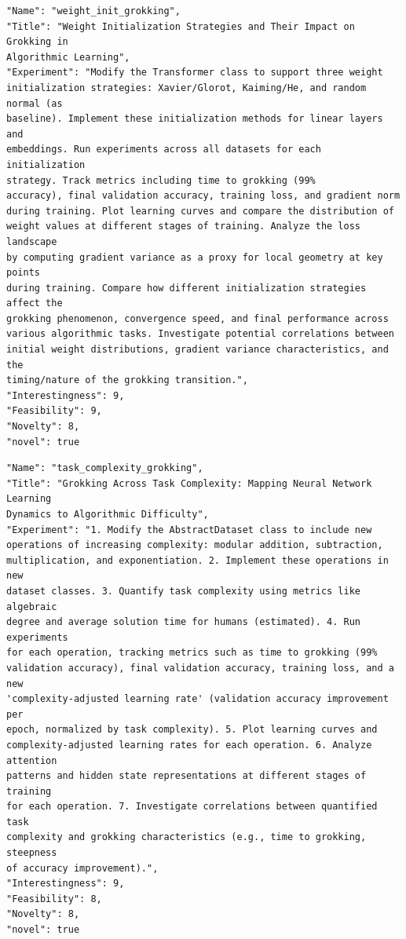 \documentclass[11pt, a4paper]{include/gdm_format}
\begin{document}
\begin{tcolorbox}[breakable,colback=blue!5!white, colframe=blue!75!black, title=Idea 9/50 - \texttt{weight\_init\_grokking}]
\small
\begin{verbatim}
"Name": "weight_init_grokking",
"Title": "Weight Initialization Strategies and Their Impact on Grokking in
Algorithmic Learning",
"Experiment": "Modify the Transformer class to support three weight
initialization strategies: Xavier/Glorot, Kaiming/He, and random normal (as
baseline). Implement these initialization methods for linear layers and
embeddings. Run experiments across all datasets for each initialization
strategy. Track metrics including time to grokking (99%
accuracy), final validation accuracy, training loss, and gradient norm
during training. Plot learning curves and compare the distribution of
weight values at different stages of training. Analyze the loss landscape
by computing gradient variance as a proxy for local geometry at key points
during training. Compare how different initialization strategies affect the
grokking phenomenon, convergence speed, and final performance across
various algorithmic tasks. Investigate potential correlations between
initial weight distributions, gradient variance characteristics, and the
timing/nature of the grokking transition.",
"Interestingness": 9,
"Feasibility": 9,
"Novelty": 8,
"novel": true
\end{verbatim}
\end{tcolorbox}

\begin{tcolorbox}[breakable,colback=blue!5!white, colframe=blue!75!black, title=Idea 10/50 - \texttt{task\_complexity\_grokking}]
\small
\begin{verbatim}
"Name": "task_complexity_grokking",
"Title": "Grokking Across Task Complexity: Mapping Neural Network Learning
Dynamics to Algorithmic Difficulty",
"Experiment": "1. Modify the AbstractDataset class to include new
operations of increasing complexity: modular addition, subtraction,
multiplication, and exponentiation. 2. Implement these operations in new
dataset classes. 3. Quantify task complexity using metrics like algebraic
degree and average solution time for humans (estimated). 4. Run experiments
for each operation, tracking metrics such as time to grokking (99%
validation accuracy), final validation accuracy, training loss, and a new
'complexity-adjusted learning rate' (validation accuracy improvement per
epoch, normalized by task complexity). 5. Plot learning curves and
complexity-adjusted learning rates for each operation. 6. Analyze attention
patterns and hidden state representations at different stages of training
for each operation. 7. Investigate correlations between quantified task
complexity and grokking characteristics (e.g., time to grokking, steepness
of accuracy improvement).",
"Interestingness": 9,
"Feasibility": 8,
"Novelty": 8,
"novel": true
\end{verbatim}
\end{tcolorbox}
\end{document}
